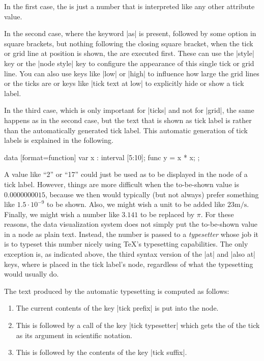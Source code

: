 In the first case, the  is just a number that is interpreted like
any other attribute value.

In the second case, where the keyword |as| is present, followed by some option
in square brackets, but nothing following the closing square bracket, when the
tick or grid line at position  is shown, the 
are executed first. These can use the |style| key or the |node style| key to
configure the appearance of this single tick or grid line. You can also use
keys like |low| or |high| to influence how large the grid lines or the ticks
are or keys like |tick text at low| to explicitly hide or show a tick label.

In the third case, which is only important for |ticks| and not for |grid|, the
same happens as in the second case, but the text that is shown as tick label is
 rather than the automatically generated tick label. This automatic
generation of tick labels is explained in the following.
%
\begin{codeexample}[preamble={\usetikzlibrary{datavisualization.formats.functions}}]
\tikz \datavisualization
  [scientific axes=clean,
   x axis={length=2.5cm, ticks={major at={
         5,
         6 as [style=red],
         7 as [{style=blue, low=-1em}],
         8 as [style=green] $2^3$,
         10 as ten
       }}},
   visualize as line]
  data [format=function] {
    var x : interval [5:10];
    func y = \value x * \value x;
  };
\end{codeexample}

A value like ``2'' or ``17'' could just be used as  to be displayed
in the node of a tick label. However, things are more difficult when the
to-be-shown value is $0.0000000015$, because we then would typically (but not
always) prefer something like $1.5 \cdot 10^{-9}$ to be shown. Also, we might
wish a unit to be added like $23\mathrm{m}/\mathrm{s}$. Finally, we might wish
a number like $3.141$ to be replaced by $\pi$. For these reasons, the data
visualization system does not simply put the to-be-shown value in a node as
plain text. Instead, the number is passed to a \emph{typesetter} whose job it
is to typeset this number nicely using \TeX's typesetting capabilities. The
only exception is, as indicated above, the third syntax version of the |at| and
|also at| keys, where  is placed in the tick label's node,
regardless of what the typesetting would usually do.

The text produced by the automatic typesetting is computed as follows:
%
\begin{enumerate}
    \item The current contents of the key |tick prefix| is put into the node.
    \item This is followed by a call of the key |tick typesetter| which gets
        the  of the tick as its argument in scientific notation.
    \item This is followed by the contents of the key |tick suffix|.
\end{enumerate}

